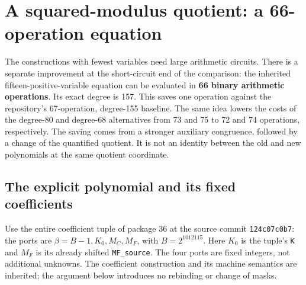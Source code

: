 \section{A squared-modulus quotient: a 66-operation equation}
\label{sec:squared-modulus}

The constructions with fewest variables need large arithmetic circuits.
There is a separate improvement at the short-circuit end of the comparison:
the inherited fifteen-positive-variable equation can be evaluated in
\textbf{66 binary arithmetic operations}.  Its exact degree is 157.  This
saves one operation against the repository's 67-operation, degree-155
baseline.  The same idea lowers the costs of the degree-80 and degree-68
alternatives from 73 and 75 to 72 and 74 operations, respectively.
The saving comes from a stronger auxiliary congruence, followed by a change
of the quantified quotient.  It is not an identity between the old and new
polynomials at the same quotient coordinate.

\subsection{The explicit polynomial and its fixed coefficients}

Use the entire coefficient tuple of package 36 at the source commit
\texttt{124c07c0b7}: the ports are
\(\beta=B-1,K_0,M_C,M_F\), with \(B=2^{1012115}\).
Here \(K_0\) is the tuple's \texttt{K} and \(M_F\) is its already shifted
\texttt{MF\_source}.  The four ports are fixed integers, not additional
unknowns.  The coefficient construction and its machine semantics are
inherited; the argument below introduces no rebinding or change of masks.

